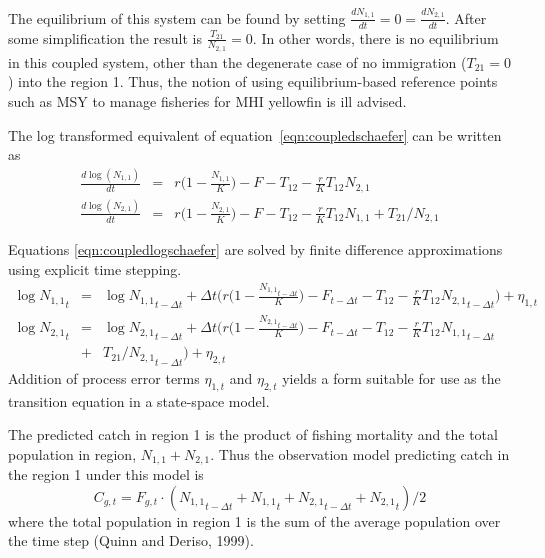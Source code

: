 \documentclass[12pt,letterpaper]{article}
\newcommand\None{{N_{1,1}}}
\newcommand\Ntwo{{N_{2,1}}}
\begin{document}
The equilibrium of this system can be found by setting
$\frac{d\None}{dt} = 0 = \frac{d\Ntwo}{dt}$. After some simplification
the result is $\frac{T_{21}}{\Ntwo} = 0$. In other words, there is no
equilibrium in this coupled system, other than the degenerate case of
no immigration ($T_{21}=0$) into the region 1. Thus, the notion of using
equilibrium-based reference points such as MSY to manage fisheries for
MHI yellowfin is ill advised.


The log transformed equivalent of equation~\ref{eqn:coupledschaefer} can be written as
\begin{eqnarray}
\frac{d\log(\None)}{dt}&=&r\Big(1-\frac{\None}{K}\Big) -F - T_{12} - \frac{r}{K}T_{12}\Ntwo\nonumber\\
\frac{d\log(\Ntwo)}{dt}&=&r\Big(1-\frac{\Ntwo}{K}\Big) -F - T_{12} - \frac{r}{K}T_{12}\None + T_{21}/\Ntwo
\label{eqn:coupledlogschaefer}
\end{eqnarray}

Equations \ref{eqn:coupledlogschaefer} are solved by finite difference
approximations using explicit time stepping.
\begin{eqnarray}
\log \None_t &=& \log \None_{t-\Delta t} +\Delta t\bigg(r\Big(1-\frac{\None_{t-\Delta t}}{K}\Big)
-F_{t-\Delta t} - T_{12} - \frac{r}{K}T_{12}\Ntwo_{t-\Delta t}\bigg)+\eta_{1,t}\nonumber\\
\log \Ntwo_t &=& \log \Ntwo_{t-\Delta t} +\Delta t\bigg(r\Big(1-\frac{\Ntwo_{t-\Delta t}}{K}\Big)
-F_{t-\Delta t} - T_{12} - \frac{r}{K}T_{12}\None_{t-\Delta t}\nonumber\\
     &+&T_{21}/\Ntwo_{t-\Delta t}\bigg)+\eta_{2,t}
\label{eqn:finitecoupledlogschaefer}
\end{eqnarray}
Addition of process error terms $\eta_{1,t}$ and $\eta_{2,t}$ yields a form suitable
for use as the transition equation in a state-space model.

The predicted catch in region 1 is the product of fishing mortality
and the total population in region, $\None+\Ntwo$.
Thus the observation model predicting catch in the region 1
under this model is
\begin{equation}
C_{g,t} = F_{g,t}\cdot(\None_{t-\Delta t}+\None_t+\Ntwo_{t-\Delta t}+\Ntwo_t)/2
\label{eqn:catcheqn}
\end{equation}
where the total population in region 1 is the sum of the average
population over the time step (Quinn and Deriso, 1999).
\end{document}
